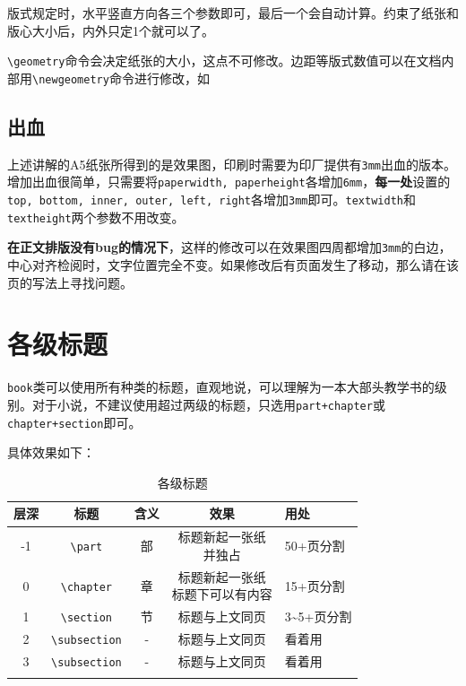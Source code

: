 \documentclass[10pt,openany]{book}
\begin{document}


版式规定时，水平竖直方向各三个参数即可，最后一个会自动计算。约束了纸张和版心大小后，内外只定1个就可以了。

\texttt{\textbackslash{}geometry}命令会决定纸张的大小，这点不可修改。边距等版式数值可以在文档内部用\texttt{\textbackslash{}newgeometry}命令进行修改，如



\subsection{出血}

上述讲解的A5纸张所得到的是效果图，印刷时需要为印厂提供有\texttt{3mm}出血的版本。增加出血很简单，只需要将\texttt{paperwidth,\ paperheight}各增加\texttt{6mm}，\textbf{每一处}设置的\texttt{top,\ bottom,\ inner,\ outer,\ left,\ right}各增加\texttt{3mm}即可。\texttt{textwidth}和\texttt{textheight}两个参数不用改变。

\textbf{在正文排版没有bug的情况下}，这样的修改可以在效果图四周都增加\texttt{3mm}的白边，中心对齐检阅时，文字位置完全不变。如果修改后有页面发生了移动，那么请在该页的写法上寻找问题。

\section{各级标题}

\texttt{book}类可以使用所有种类的标题，直观地说，可以理解为一本大部头教学书的级别。对于小说，不建议使用超过两级的标题，只选用\texttt{part+chapter}或\texttt{chapter+section}即可。

具体效果如下：

\begin{center}
    \begin{longtable}{ccccl}
        \textbf{层深} & \textbf{标题}                        & \textbf{含义} & \textbf{效果}       & \textbf{用处}           \\
        \hline
        \endfirsthead
        -1          & \texttt{\textbackslash part}       & 部           & \makecell{标题新起一张纸                         \\并独占} & 50+页分割  \\
        \hline
        0           & \texttt{\textbackslash chapter}    & 章           & \makecell{标题新起一张纸                         \\标题下可以有内容} & 15+页分割\\
        \hline
        1           & \texttt{\textbackslash section}    & 节           & 标题与上文同页           & 3\textasciitilde5+页分割 \\
        \hline
        2           & \texttt{\textbackslash subsection} & -           & 标题与上文同页           & 看着用                   \\
        \hline
        3           & \texttt{\textbackslash subsection} & -           & 标题与上文同页           & 看着用                   \\
        \hline
        \caption{各级标题}
    \end{longtable}
\end{center}
\end{document}
